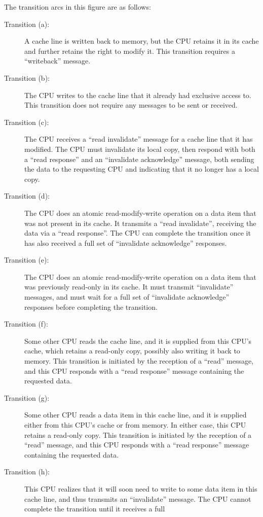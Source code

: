 The transition arcs in this figure are as follows:
\begin{description}
\item[Transition (a):]
	A cache line is written back to memory, but the CPU retains
	it in its cache and further retains the right to modify it.
	This transition requires a ``writeback'' message.
\item[Transition (b):]
	The CPU writes to the cache line that it already had exclusive
	access to.
	This transition does not require any messages to be sent or
	received.
\item[Transition (c):]
	The CPU receives a ``read invalidate'' message for a cache line
	that it has modified.
	The CPU must invalidate its local copy, then respond with both a
	``read response'' and an ``invalidate acknowledge'' message,
	both sending the data to the requesting CPU and indicating
	that it no longer has a local copy.
\item[Transition (d):]
	The CPU does an atomic read-modify-write operation on a data item
	that was not present in its cache.
	It transmits a ``read invalidate'', receiving the data via
	a ``read response''.
	The CPU can complete the transition once it has also received a
	full set of ``invalidate acknowledge'' responses.
\item[Transition (e):]
	The CPU does an atomic read-modify-write operation on a data item
	that was previously read-only in its cache.
	It must transmit ``invalidate'' messages, and must wait for a
	full set of ``invalidate acknowledge'' responses before completing
	the transition.
\item[Transition (f):]
	Some other CPU reads the cache line, and it is supplied from
	this CPU's cache, which retains a read-only copy, possibly also
	writing it back to memory.
	This transition is initiated by the reception of a ``read''
	message, and this CPU responds with a ``read response'' message
	containing the requested data.
\item[Transition (g):]
	Some other CPU reads a data item in this cache line,
	and it is supplied either from this CPU's cache or from memory.
	In either case, this CPU retains a read-only copy.
	This transition is initiated by the reception of a ``read''
	message, and this CPU responds with a ``read response'' message
	containing the requested data.
\item[Transition (h):]
	This CPU realizes that it will soon need to write to some data
	item in this cache line, and thus transmits an ``invalidate'' message.
	The CPU cannot complete the transition until it receives a full

\end{description}
